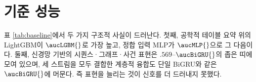 
\section{기준 성능}
\label{sec:results-baseline}



표 \ref{tab:baseline}에서 두 가지 구조적 사실이 드러난다. 첫째, 공학적 테이블 요약 위의 LightGBM이 $\aucLGBM{}$로 가장 높고, 정합 입력 MLP가 $\aucMLP{}$으로 그 다음이다. 둘째, 신경망 기반의 시퀀스·그래프·사건 표현은 $.569$--$\aucBiGRU{}$의 좁은 띠에 모여 있으며, 세 스트림을 모두 결합한 계층적 융합도 단일 BiGRU와 같은 $\aucBiGRU{}$에 머문다. 즉 표현을 늘리는 것이 신호를 더 드러내지 못했다.
